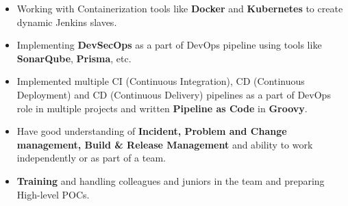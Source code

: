 \documentclass[11pt, a4paper]{article}
\begin{document}
\begin{itemize}[noitemsep, nolistsep,leftmargin=5mm,rightmargin=2mm,label=\textcolor{NavyBlue}{\textbullet}]
\item Working with Containerization tools like \textbf{Docker} and \textbf{Kubernetes} to create dynamic Jenkins slaves.
\item Implementing \textbf{DevSecOps} as a part of DevOps pipeline using tools like \textbf{SonarQube}, \textbf{Prisma}, etc.
\item Implemented multiple CI (Continuous Integration), CD (Continuous Deployment) and CD (Continuous Delivery) pipelines as a part of DevOps role in multiple projects and written \textbf{Pipeline as Code} in \textbf{Groovy}.
\item Have good understanding of \textbf{Incident, Problem and Change management, Build \& Release Management} and ability to work independently or as part of a team.
\item \textbf{Training} and handling colleagues and juniors in the team and preparing High-level POCs.
\end{itemize}
\pagebreak

\end{document}
